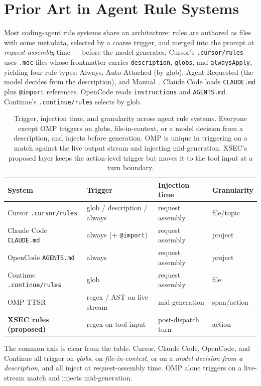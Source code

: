 \documentclass[11pt]{article}
\begin{document}
\section{Prior Art in Agent Rule Systems}
\label{sec:priorart}

Most coding-agent rule systems share an architecture: rules are authored as
files with some metadata, selected by a coarse trigger, and merged into the
prompt at \emph{request-assembly} time --- before the model generates. Cursor's
\texttt{.cursor/rules} uses \texttt{.mdc} files whose frontmatter carries
\texttt{description}, \texttt{globs}, and \texttt{alwaysApply}, yielding four
rule types: Always, Auto-Attached (by glob), Agent-Requested (the model decides
from the description), and Manual~\cite{cursorrules}. Claude Code loads
\texttt{CLAUDE.md} plus \texttt{@import} references. OpenCode reads
\texttt{instructions} and \texttt{AGENTS.md}. Continue's \texttt{.continue/rules}
selects by glob.

\begin{table}[ht]
\centering
\small
\begin{tabular}{llll}
\toprule
System & Trigger & Injection time & Granularity \\
\midrule
Cursor \texttt{.cursor/rules} & glob / description / always & request assembly & file/topic \\
Claude Code \texttt{CLAUDE.md} & always (+ \texttt{@import}) & request assembly & project \\
OpenCode \texttt{AGENTS.md} & always & request assembly & project \\
Continue \texttt{.continue/rules} & glob & request assembly & file \\
OMP TTSR & regex / AST on live stream & mid-generation & span/action \\
\textbf{XSEC rules (proposed)} & regex on tool input & post-dispatch turn & action \\
\bottomrule
\end{tabular}
\caption{Trigger, injection time, and granularity across agent rule systems.
Everyone except OMP triggers on globs, file-in-context, or a model decision from
a description, and injects before generation. OMP is unique in triggering on a
match against the live output stream and injecting mid-generation. XSEC's
proposed layer keeps the action-level trigger but moves it to the tool input at a
turn boundary.}
\end{table}

The common axis is clear from the table. Cursor, Claude Code, OpenCode, and
Continue all trigger on \emph{globs}, on \emph{file-in-context}, or on a
\emph{model decision from a description}, and all inject at request-assembly
time. OMP alone triggers on a live-stream match and injects mid-generation.
\end{document}
